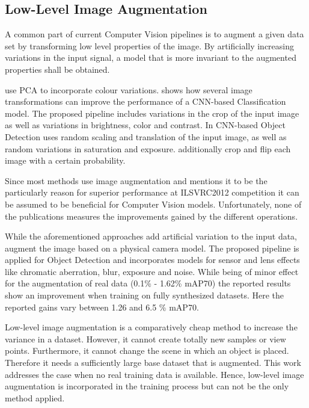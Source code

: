 \subsection{Low-Level Image Augmentation}

A common part of current Computer Vision pipelines is to augment a given data set by transforming low level properties of the image. By artificially increasing variations in the input signal, a model that is more invariant to the augmented properties shall be obtained.

\citeauthor{Krizhevsky2012a} \cite{Krizhevsky2012a} use \ac{PCA} to incorporate colour variations. \citeauthor{Howard2013} \cite{Howard2013} shows how several image transformations can improve the performance of a \ac{CNN}-based Classification model. The proposed pipeline includes variations in the crop of the input image as well as variations in brightness, color and contrast. In \ac{CNN}-based Object Detection \citeauthor{Redmon} \cite{Redmon} uses random scaling and translation of the input image, as well as random variations in saturation and exposure. \citeauthor{Liu} \cite{Liu} additionally crop and flip each image with a certain probability.

Since most methods use image augmentation and \citeauthor{Krizhevsky2012a} \cite{Krizhevsky2012a} mentions it to be the particularly reason for superior performance at ILSVRC2012 competition it can be assumed to be beneficial for Computer Vision models. Unfortunately, none of the publications measures the improvements gained by the different operations. 

While the aforementioned approaches add artificial variation to the input data, \citeauthor{Carlson2018}\cite{Carlson2018} augment the image based on a physical camera model. The proposed pipeline is applied for Object Detection and incorporates models for sensor and lens effects like chromatic aberration, blur, exposure and noise. While being of minor effect for the augmentation of real data (0.1\% - 1.62\% \ac{mAP}70) the reported results show an improvement when training on fully synthesized datasets. Here the reported gains vary between 1.26 and 6.5 \% \ac{mAP}70.

Low-level image augmentation is a comparatively cheap method to increase the variance in a dataset. However, it cannot create totally new samples or view points. Furthermore, it cannot change the scene in which an object is placed. Therefore it needs a sufficiently large base dataset that is augmented. This work addresses the case when no real training data is available. Hence, low-level image augmentation is incorporated in the training process but can not be the only method applied.

